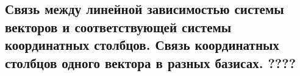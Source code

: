{
\subsection{Связь между линейной зависимостью системы векторов и соответствующей системы координатных столбцов. Связь координатных столбцов одного вектора в разных базисах. ????}

}